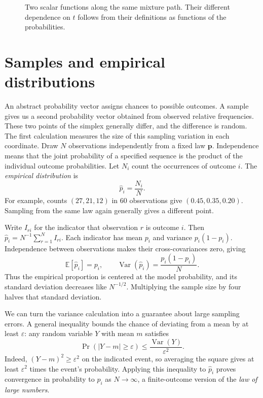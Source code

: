 \documentclass[11pt,oneside,openany]{book}
\theoremstyle{definition}
\theoremstyle{remark}
\newcommand{\E}{\mathbb{E}}
\newcommand{\Var}{\operatorname{Var}}
\newcommand{\p}{\mathbf{p}}
\numberwithin{equation}{chapter}
\begin{document}
\begin{figure}[htbp]
\centering
{}
\caption{Two scalar functions along the same mixture path. Their different dependence on $t$ follows from their definitions as functions of the probabilities.}
\end{figure}

\section{Samples and empirical distributions}
An abstract probability vector assigns chances to possible outcomes. A sample gives us a second probability vector obtained from observed relative frequencies. These two points of the simplex generally differ, and the difference is random. The first calculation measures the size of this sampling variation in each coordinate.
Draw $N$ observations independently from a fixed law $\p$. Independence means that the joint probability of a specified sequence is the product of the individual outcome probabilities. Let $N_i$ count the occurrences of outcome $i$. The \emph{empirical distribution} is
\[
\widehat p_i=\frac{N_i}{N}.
\]
For example, counts $(27,21,12)$ in 60 observations give $(0.45,0.35,0.20)$. Sampling from the same law again generally gives a different point.

Write $I_{ri}$ for the indicator that observation $r$ is outcome $i$. Then $\widehat p_i=N^{-1}\sum_{r=1}^N I_{ri}$. Each indicator has mean $p_i$ and variance $p_i(1-p_i)$. Independence between observations makes their cross-covariances zero, giving
\begin{equation}\label{eq:empiricalmoments}
\E[\widehat p_i]=p_i,\qquad
\Var(\widehat p_i)=\frac{p_i(1-p_i)}{N}.
\end{equation}
Thus the empirical proportion is centered at the model probability, and its standard deviation decreases like $N^{-1/2}$. Multiplying the sample size by four halves that standard deviation.

We can turn the variance calculation into a guarantee about large sampling errors. A general inequality bounds the chance of deviating from a mean by at least $\varepsilon$: any random variable $Y$ with mean $m$ satisfies
\[
\Pr(|Y-m|\geq\varepsilon)\leq\frac{\Var(Y)}{\varepsilon^2}.
\]
Indeed, $(Y-m)^2\geq\varepsilon^2$ on the indicated event, so averaging the square gives at least $\varepsilon^2$ times the event's probability. Applying this inequality to $\widehat p_i$ proves convergence in probability to $p_i$ as $N\to\infty$, a finite-outcome version of the \emph{law of large numbers}.
\end{document}
